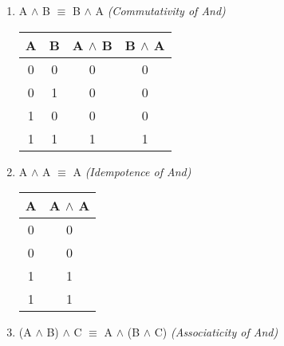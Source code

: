 \documentclass[12pt]{article}
\begin{document}
\begin{enumerate}

  \item A $\land$ B $\equiv$ B $\land$ A \emph{(Commutativity of And)}



\begin{center}

  \begin{tabular}{| c | c | c | c |}

    \hline

    A & B & A $\land$ B & B $\land$ A \\ \hline

    0 & 0 & 0 & 0 \\

    0 & 1 & 0 & 0 \\

    1 & 0 & 0 & 0 \\

    1 & 1 & 1 & 1 \\ \hline

  \end{tabular}

\end{center}



  \item A $\land$ A $\equiv$ A \emph{(Idempotence of And)}



\begin{center}

  \begin{tabular}{| c | c |}

    \hline

    A & A $\land$ A \\ \hline

    0 & 0 \\

    0 & 0 \\

    1 & 1 \\

    1 & 1 \\ \hline

  \end{tabular}

\end{center}



  \item (A $\land$ B) $\land$ C $\equiv$ A $\land$ (B $\land$ C) \emph{(Associaticity of And)}




\end{enumerate}
\end{document}
